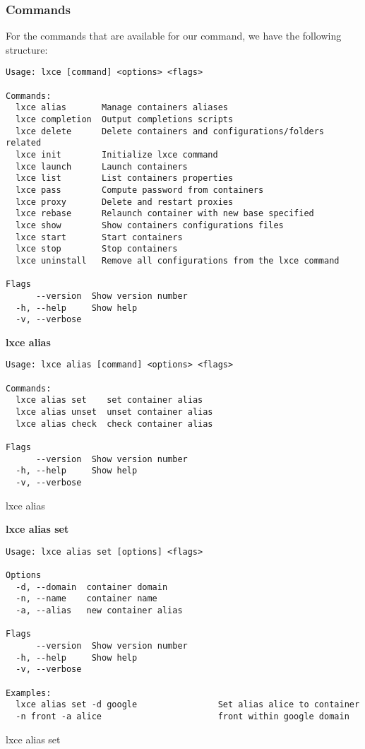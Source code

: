 \newpage
\subsubsection{Commands}
For the commands that are available for our command, we have the following structure:
\begin{verbatim}
Usage: lxce [command] <options> <flags>

Commands:
  lxce alias       Manage containers aliases
  lxce completion  Output completions scripts
  lxce delete      Delete containers and configurations/folders related
  lxce init        Initialize lxce command
  lxce launch      Launch containers
  lxce list        List containers properties
  lxce pass        Compute password from containers
  lxce proxy       Delete and restart proxies 
  lxce rebase      Relaunch container with new base specified
  lxce show        Show containers configurations files
  lxce start       Start containers
  lxce stop        Stop containers
  lxce uninstall   Remove all configurations from the lxce command

Flags
      --version  Show version number        
  -h, --help     Show help                 
  -v, --verbose
\end{verbatim}

\newpage
\textbf{lxce alias}
\begin{listing}[H]
\begin{verbatim}
Usage: lxce alias [command] <options> <flags>

Commands:
  lxce alias set    set container alias
  lxce alias unset  unset container alias
  lxce alias check  check container alias

Flags
      --version  Show version number                                   
  -h, --help     Show help                                             
  -v, --verbose
\end{verbatim}
\caption{lxce alias}
\label{listings: lxce alias}
\end{listing}

\textbf{lxce alias set}
\begin{listing}[H]
\begin{verbatim}
Usage: lxce alias set [options] <flags>

Options
  -d, --domain  container domain                             
  -n, --name    container name                               
  -a, --alias   new container alias                          

Flags
      --version  Show version number                                   
  -h, --help     Show help                                            
  -v, --verbose

Examples:
  lxce alias set -d google                Set alias alice to container 
  -n front -a alice                       front within google domain
\end{verbatim}
\caption{lxce alias set}
\label{listings: lxce alias set}
\end{listing}

